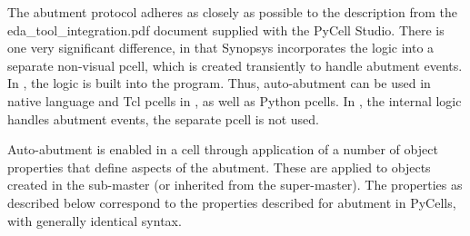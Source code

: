 %

The abutment protocol adheres as closely as possible to the
description from the {\vt eda\_tool\_integration.pdf} document
supplied with the PyCell Studio.  There is one very significant
difference, in that Synopsys incorporates the logic into a separate
non-visual pcell, which is created transiently to handle abutment
events.  In {\Xic}, the logic is built into the program.  Thus,
auto-abutment can be used in native language and Tcl pcells in {\Xic},
as well as Python pcells.  In {\Xic}, the internal logic handles
abutment events, the separate pcell is not used.

Auto-abutment is enabled in a cell through application of a number of
object properties that define aspects of the abutment.  These are
applied to objects created in the sub-master (or inherited from the
super-master).  The {\Xic} properties as described below correspond to
the properties described for abutment in PyCells, with generally
identical syntax.

